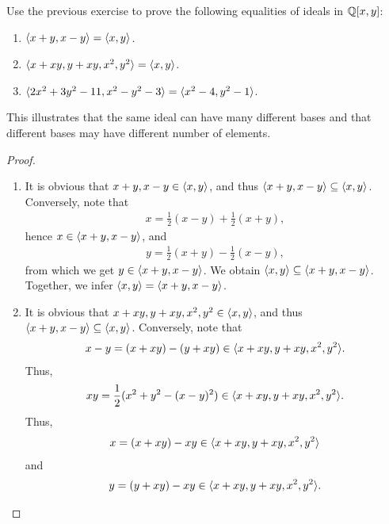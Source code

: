 \begin{exercise}{3}
    Use the previous exercise to prove the following equalities of ideals in $\mathbb{Q}[x,y]$:
    \begin{enumerate}
        \item $\langle x+y,x-y\rangle = \langle x,y\rangle$.
        \item $\langle x+xy, y+xy, x^2, y^2\rangle = \langle x,y\rangle$.
        \item $\langle 2x^2 + 3y^2 - 11, x^2 - y^2 - 3\rangle = \langle x^2 - 4, y^2 -1\rangle$.
    \end{enumerate}
    This illustrates that the same ideal can have many different bases and that different bases may have different number of elements.
\end{exercise}
\begin{proof}
    \begin{enumerate}
        \item It is obvious that $x+y, x-y\in \langle x,y\rangle$, and thus $\langle x+y,x-y\rangle \subseteq \langle x,y\rangle$. 
        Conversely, note that
        \begin{align*}
            x = \frac{1}{2}(x-y) + \frac{1}{2}(x+y),
        \end{align*}
        hence $x\in \langle x+y,x-y\rangle$, and
        \begin{align*}
            y = \frac{1}{2}(x+y) - \frac{1}{2}(x-y),
        \end{align*}
        from which we get $y\in \langle x+y,x-y\rangle$. We obtain $\langle x,y\rangle \subseteq \langle x+y,x-y\rangle$. Together, we infer $\langle x,y\rangle = \langle x+y,x-y\rangle$.
        \item It is obvious that $x+xy, y+xy, x^2, y^2\in \langle x,y\rangle$, and thus $\langle x+y,x-y\rangle \subseteq \langle x,y\rangle$. 
        Conversely, note that
        \begin{align*}
            x-y = (x+xy) - (y+xy)\in \langle x+xy, y+xy, x^2, y^2\rangle.
        \end{align*}
        Thus,
        \begin{align*}
            xy = \frac{1}{2}(x^2 + y^2 - (x-y)^2)\in \langle x+xy, y+xy, x^2, y^2\rangle.
        \end{align*}
        Thus,
        \begin{align*}
            x = (x+xy) - xy \in \langle x+xy, y+xy, x^2, y^2\rangle
        \end{align*}
        and
        \begin{align*}
            y = (y+xy) - xy \in \brackets{x+xy, y+xy, x^2, y^2}.

\end{align*}
\end{enumerate}
\end{proof}
